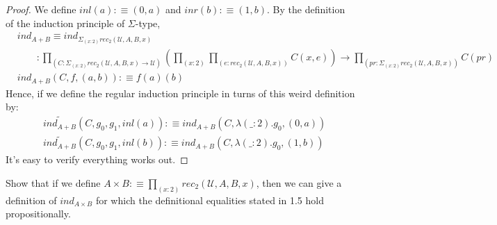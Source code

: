 \documentclass{article}
\begin{document}
\begin{proof}
  We define $inl(a) :\equiv (0,a)$ and $inr(b) :\equiv (1,b)$. By the definition
  of the induction principle of $\Sigma$-type,
  \begin{align*}
    & ind_{A + B} \equiv ind_{\Sigma_{(x : 2)} rec_2(\mathcal{U}, A , B, x)}\\
    & \qquad : \prod_{(C : \Sigma_{(x : 2)} rec_2(\mathcal{U}, A , B, x) \to \mathcal{U})}
    \left( \prod_{(x : 2)} \prod_{(e : rec_2(\mathcal{U}, A, B, x))} C(x,e) \right)
    \to \prod_{(pr : \Sigma_{(x : 2)} rec_2(\mathcal{U}, A , B, x))} C(pr)\\
    & ind_{A + B}(C, f, (a,b)) :\equiv f(a)(b)
  \end{align*}
  Hence, if we define the regular induction principle in turns of this weird
  definition by:
  \begin{align*}
    & \widetilde{ind_{A + B}}(C, g_0, g_1, inl(a)) :\equiv ind_{A + B}(C, \lambda
    (\_: 2) . g_0, (0, a))\\
    & \widetilde{ind_{A + B}}(C, g_0, g_1, inl(b)) :\equiv ind_{A + B}(C, \lambda
    (\_: 2) . g_0, (1, b))
  \end{align*}
  It's easy to verify everything works out.
\end{proof}

\begin{xprob}{1.6}
  Show that if we define $A \times B :\equiv \prod_{(x : 2)} rec_2(\mathcal{U},
  A, B, x)$, then we can give a definition of $ind_{A \times B}$ for which the
  definitional equalities stated in 1.5 hold propositionally.
\end{xprob}
\end{document}

